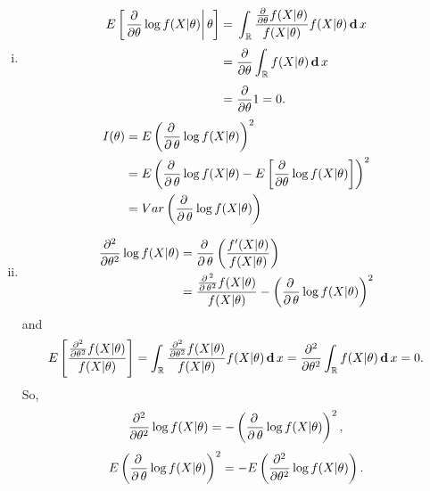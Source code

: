 \begin{solution}
    \begin{enumerate}[(i)]
        \item \[
            \begin{aligned}
                E  \left[\left.{\frac {\partial }{\partial \theta }}\log f(X|\theta )\right|\theta \right]={}&\int _{\mathbb {R} }{\frac {{\frac {\partial }{\partial \theta }}f(X|\theta )}{f(X|\theta )}}f(X|\theta )\,\mathbf{d}\, x\\[3pt]={}&{\frac {\partial }{\partial \theta }}\int _{\mathbb {R} }f(X|\theta )\,\mathbf{d}\, x\\[3pt]={}&{\frac {\partial }{\partial \theta }}1=0.
            \end{aligned}
        \]
        \[
            \begin{aligned}
                I(\theta)&=E\left(\frac{\partial\,}{\partial\, \theta}\log f(X|\theta)\right)^2\\
                &=E\left(\frac{\partial\,}{\partial\, \theta}\log f(X|\theta)- E  \left[{\frac {\partial }{\partial \theta }}\log f(X|\theta )\right]\right)^2\\
                &=Var\left(\frac{\partial\,}{\partial\, \theta}\log f(X|\theta)\right)
            \end{aligned}
        \]
        \item \[
            \begin{aligned}
                \frac {\partial ^{2}}{\partial \theta ^{2}}\log f(X|\theta )&=\frac{\partial\,}{\partial\, \theta}\left(\frac{f'(X|\theta)}{f(X|\theta)}\right)\\
                &=\frac{\frac{\partial\,^2}{\partial\,\theta^2}f(X|\theta)}{f(X|\theta)}-\left(\frac{\partial\,}{\partial\, \theta}\log f(X|\theta)\right)^2
            \end{aligned}
        \]
        and
        \[
            E \left[{\frac {{\frac {\partial ^{2}}{\partial \theta ^{2}}}f(X|\theta )}{f(X|\theta )}}\right]=\int_{\mathbb{R}}{\frac {{\frac {\partial ^{2}}{\partial \theta ^{2}}}f(X|\theta )}{f(X|\theta )}}f(X|\theta )\,\mathbf{d}\, x={\frac {\partial ^{2}}{\partial \theta ^{2}}}\int _{\mathbb {R} }f(X|\theta )\,\mathbf{d}\, x=0. 
        \]
        So, \[
            \frac {\partial ^{2}}{\partial \theta ^{2}}\log f(X|\theta )=-\left(\frac{\partial\,}{\partial\, \theta}\log f(X|\theta)\right)^2, 
        \]
        \[
            E\left(\frac{\partial\,}{\partial\, \theta}\log f(X|\theta)\right)^2=-E\left(\frac {\partial ^{2}}{\partial \theta ^{2}}\log f(X|\theta )\right). 
        \]
    \end{enumerate}
\end{solution}

